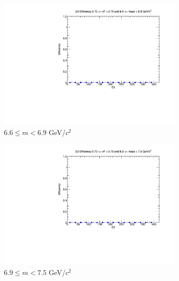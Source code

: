 \begin{figure}[p]
\begin{subfigure}[b]{0.32\textwidth}
        \includegraphics[width=\textwidth]{./kTrackerEfficiencyPlots/D2_Efficiency_xF14_mass8.pdf}
        \caption{$6.6 \leq m < 6.9$ GeV/$c^2$}
        \label{fig:xF14_mass8}
    \end{subfigure}
    \vspace{0.5cm}
    \begin{subfigure}[b]{0.32\textwidth}
        \centering
        \includegraphics[width=\textwidth]{./kTrackerEfficiencyPlots/D2_Efficiency_xF14_mass9.pdf}
        \caption{$6.9 \leq m < 7.5$ GeV/$c^2$}
        \label{fig:xF14_mass9}
    \end{subfigure}
    \hfill
    \begin{subfigure}[b]{0.32\textwidth}
        \centering

\end{subfigure}
\end{figure}
